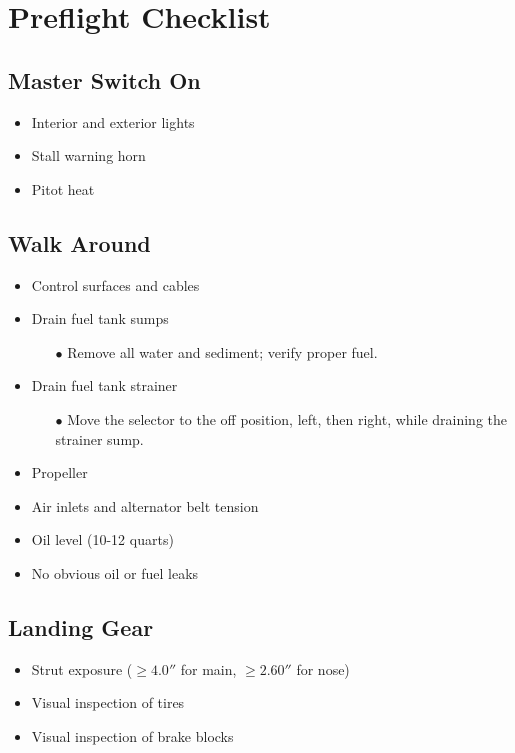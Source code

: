\def\todoitem#1{
    \item[$\square$] #1 \dotfill
}

\section{Preflight Checklist}

\subsection{Master Switch On}

\begin{itemize}
    \todoitem{Interior and exterior lights}
    \todoitem{Stall warning horn}
    \todoitem{Pitot heat}
\end{itemize}

\subsection{Walk Around}

\begin{itemize}
    \todoitem{Control surfaces and cables}
    \todoitem{Drain fuel tank sumps}
    \begin{itemize}
        \item[$\bullet$] Remove all water and sediment; verify proper fuel.
    \end{itemize}
    \todoitem{Drain fuel tank strainer}
    \begin{itemize}
        \item[$\bullet$] {
            Move the selector to the off position, left, then right,
            while draining the strainer sump.
        }
    \end{itemize}
    \todoitem{Propeller}
    \todoitem{Air inlets and alternator belt tension}
    \todoitem{Oil level (10-12 quarts)}
    \todoitem{No obvious oil or fuel leaks}
\end{itemize}

\subsection{Landing Gear}

\begin{itemize}
    \todoitem{Strut exposure ($\geq 4.0''$ for main, $\geq 2.60''$ for nose)}
    \todoitem{Visual inspection of tires}
    \todoitem{Visual inspection of brake blocks}
\end{itemize}


